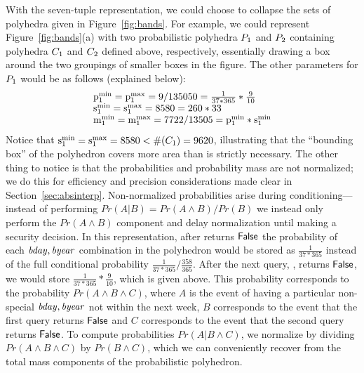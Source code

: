 
With the seven-tuple representation, we could choose to collapse the
sets of polyhedra given in Figure~\ref{fig:bands}.  For example, we
could represent Figure~\ref{fig:bands}(a) with two probabilistic
polyhedra $P_{1}$ and $P_{2}$ containing polyhedra $C_{1}$ and
$C_{2}$ defined above, respectively, essentially drawing a box
around the two groupings of smaller boxes in the figure.  The other
parameters for $P_{1}$ would be as follows (explained below):
$$
\begin{array}{l}
\mathrm{p}^\mathrm{min}_{1} = \mathrm{p}^\mathrm{max}_{1} = 9/135050 = \frac{1}{37*365}*\frac{9}{10} \\
\mathrm{s}^\mathrm{min}_{1} = \mathrm{s}^\mathrm{max}_{1} = 8580 = 260 * 33 \\
\mathrm{m}^\mathrm{min}_{1} = \mathrm{m}^\mathrm{max}_{1} = 7722/13505 = \mathrm{p}^\mathrm{min}_{1} * \mathrm{s}^\mathrm{min}_{1} \\
\end{array}
$$ Notice that $\mathrm{s}^\mathrm{min}_{1} = \mathrm{s}^\mathrm{max}_{1} = 8580 < \#(C_{1}) =
9620$, illustrating that the ``bounding box'' of the polyhedron covers
more area than is strictly necessary. The other thing to notice is
that the probabilities and probability mass are not normalized; we do
this for efficiency and precision considerations made clear in
Section~\ref{sec:absinterp}. Non-normalized probabilities arise during
conditioning---instead of performing $ Pr(A | B) = Pr(A \wedge B) /
Pr(B) $ we instead only perform the $ Pr(A \wedge B) $ component and
delay normalization until making a security decision.  In this
representation, after  returns $
\mathsf{False} $ the probability of each $
\mathit{bday} , \mathit{byear} $ combination in the polyhedron would be stored as $
\frac{1}{37*365} $ instead of the full conditional probability $
\frac{1}{37*365}/\frac{358}{365} $.  After the next query, , returns $ \mathsf{False} $, we
would store $ \frac{1}{37*365} * \frac{9}{10} $, which is given
above.  This probability corresponds to
the probability $ Pr(A \wedge B \wedge C) $, where $ A $ is the event
of having a particular non-special $\mathit{bday},\mathit{byear}$ not within
the next week, $ B $ corresponds to the event that the first query
returns $ \mathsf{False} $ and $ C $ corresponds to the event that the second
query returns $ \mathsf{False} $. To compute 
probabilities $ Pr(A | B \wedge C)$, we normalize by dividing 
$ Pr(A \wedge B \wedge C) $ by $ Pr(B \wedge C) $, which we can
conveniently recover from the total mass components of the
probabilistic polyhedron.

